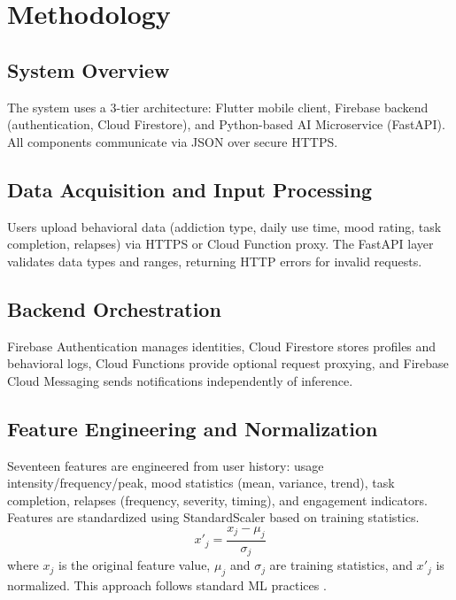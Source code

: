 \documentclass[a4paper]{article}
\begin{document}
\section{Methodology}\label{sec:methodology}


\subsection{System Overview}
The system uses a 3-tier architecture: Flutter mobile client, Firebase backend (authentication, Cloud Firestore), and Python-based AI Microservice (FastAPI). All components communicate via JSON over secure HTTPS.


\subsection{Data Acquisition and Input Processing}
Users upload behavioral data (addiction type, daily use time, mood rating, task completion, relapses) via HTTPS or Cloud Function proxy. The FastAPI layer validates data types and ranges, returning HTTP errors for invalid requests.


\subsection{Backend Orchestration}
Firebase Authentication manages identities, Cloud Firestore stores profiles and behavioral logs, Cloud Functions provide optional request proxying, and Firebase Cloud Messaging sends notifications independently of inference.


\subsection{Feature Engineering and Normalization}
Seventeen features are engineered from user history: usage intensity/frequency/peak, mood statistics (mean, variance, trend), task completion, relapses (frequency, severity, timing), and engagement indicators. Features are standardized using StandardScaler based on training statistics.
\begin{equation}
x'_j = \frac{x_j - \mu_j}{\sigma_j}
\label{eq:feature_normalization}
\end{equation}
where $x_j$ is the original feature value, $\mu_j$ and $\sigma_j$ are training statistics, and $x'_j$ is normalized. This approach follows standard ML practices \cite{b2}.
\end{document}
